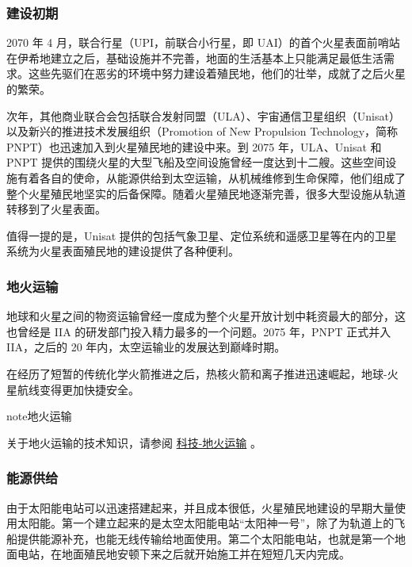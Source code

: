 \documentclass[letterpaper,10pt]{sphinxmanual}
\begin{document}
\subsubsection{建设初期}
\label{history:id20}
2070 年 4 月，联合行星（UPI，前联合小行星，即 UAI）的首个火星表面前哨站在伊希地建立之后，基础设施并不完善，地面的生活基本上只能满足最低生活需求。这些先驱们在恶劣的环境中努力建设着殖民地，他们的壮举，成就了之后火星的繁荣。

次年，其他商业联合会包括联合发射同盟（ULA）、宇宙通信卫星组织（Unisat）以及新兴的推进技术发展组织（Promotion of New Propulsion Technology，简称PNPT）也迅速加入到火星殖民地的建设中来。到 2075 年，ULA、Unisat 和 PNPT 提供的围绕火星的大型飞船及空间设施曾经一度达到十二艘。这些空间设施有着各自的使命，从能源供给到太空运输，从机械维修到生命保障，他们组成了整个火星殖民地坚实的后备保障。随着火星殖民地逐渐完善，很多大型设施从轨道转移到了火星表面。

值得一提的是，Unisat 提供的包括气象卫星、定位系统和遥感卫星等在内的卫星系统为火星表面殖民地的建设提供了各种便利。


\subsubsection{地火运输}
\label{history:index-38}\label{history:id21}
地球和火星之间的物资运输曾经一度成为整个火星开放计划中耗资最大的部分，这也曾经是 IIA 的研发部门投入精力最多的一个问题。2075 年，PNPT 正式并入 IIA，之后的 20 年内，太空运输业的发展达到巅峰时期。

在经历了短暂的传统化学火箭推进之后，热核火箭和离子推进迅速崛起，地球-火星航线变得更加快捷安全。

\begin{notice}{note}{地火运输}

关于地火运输的技术知识，请参阅 \href{http://interimm.org/InterImmBook/tech.html\#earth2mars-foldin}{科技-地火运输} 。
\end{notice}


\subsubsection{能源供给}
\label{history:id23}
由于太阳能电站可以迅速搭建起来，并且成本很低，火星殖民地建设的早期大量使用太阳能。第一个建立起来的是太空太阳能电站“太阳神一号”，除了为轨道上的飞船提供能源补充，也能无线传输给地面使用。第二个太阳能电站，也就是第一个地面电站，在地面殖民地安顿下来之后就开始施工并在短短几天内完成。
\end{document}
